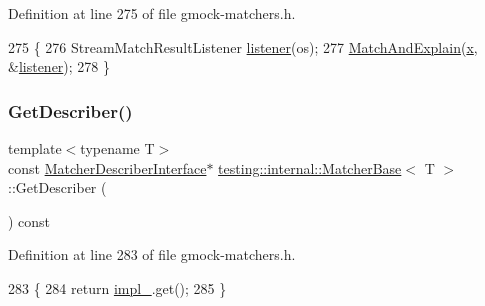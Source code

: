 Definition at line 275 of file gmock-\/matchers.\+h.


\begin{DoxyCode}
275                                                        \{
276     StreamMatchResultListener \hyperlink{namespaceinteractive__marker_a0e579ab555212bb5e2c9f8a675b7618a}{listener}(os);
277     \hyperlink{classtesting_1_1internal_1_1MatcherBase_a08429a6d7e7d330de4a4eb4e272105a7}{MatchAndExplain}(\hyperlink{namespaceinteractive__marker_acda52804aef30b460a72fb21ee01d69d}{x}, &\hyperlink{namespaceinteractive__marker_a0e579ab555212bb5e2c9f8a675b7618a}{listener});
278   \}
\end{DoxyCode}
\mbox{\label{classtesting_1_1internal_1_1MatcherBase_a9b816eb60ee16780703768d704c105e3}} 
\subsubsection{\texorpdfstring{Get\+Describer()}{GetDescriber()}}
{\footnotesize\ttfamily template$<$typename T$>$ \\
const \hyperlink{classtesting_1_1MatcherDescriberInterface}{Matcher\+Describer\+Interface}$\ast$ \hyperlink{classtesting_1_1internal_1_1MatcherBase}{testing\+::internal\+::\+Matcher\+Base}$<$ T $>$\+::Get\+Describer (\begin{DoxyParamCaption}{ }\end{DoxyParamCaption}) const\hspace{0.3cm}{\ttfamily [inline]}}



Definition at line 283 of file gmock-\/matchers.\+h.


\begin{DoxyCode}
283                                                         \{
284     \textcolor{keywordflow}{return} \hyperlink{classtesting_1_1internal_1_1MatcherBase_ab4bf73686e35b5f033e7db82498644aa}{impl\_}.get();
285   \}
\end{DoxyCode}
\mbox{\label{classtesting_1_1internal_1_1MatcherBase_a08429a6d7e7d330de4a4eb4e272105a7}} 
